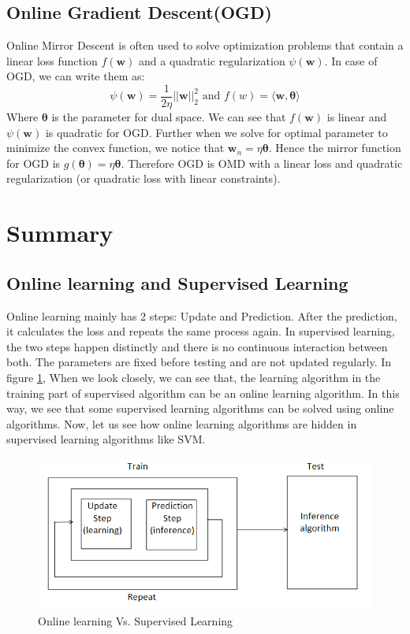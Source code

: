 \documentclass[11pt]{article}
\begin{document}
\subsection{Online Gradient Descent(OGD)}
Online Mirror Descent is often used to solve optimization problems that contain a linear loss function $f(\mathbf{w})$ and a quadratic regularization $\psi(\mathbf{w})$. In case of OGD, we can write them as:
\[\psi(\mathbf{w}) = \frac{1}{2\eta}||\mathbf{w}||_{2}^{2} \text{  and } f(w) = \langle \mathbf{w},\mathbf{\theta} \rangle\]
Where $\mathbf\theta$ is the parameter for dual space. We can see that $f(\mathbf{w})$ is linear and $\psi(\mathbf{w})$ is quadratic for OGD. Further when we solve for optimal parameter to minimize the convex function, we notice that $\mathbf{w}_{n} = \eta\mathbf{\theta}$.
Hence the mirror function for OGD is $g(\mathbf{\theta}) = \eta\mathbf{\theta}$. Therefore OGD is OMD with a linear loss and quadratic regularization (or quadratic loss with linear constraints).
\section{Summary}
\subsection{Online learning and Supervised Learning}
\normalfont
Online learning mainly has 2 steps: Update and Prediction. After the prediction, it calculates the loss and repeats the same process again. In supervised learning, the two steps happen distinctly and there is no continuous interaction between both. The parameters are fixed before testing and are not updated regularly. In figure \ref{fig:online}, When we look closely, we can see that, the learning algorithm in the training part of supervised algorithm can be an online learning algorithm. In this way, we see that some supervised learning algorithms can be solved using online algorithms. Now, let us see how online learning algorithms are hidden in supervised learning algorithms like SVM.
\begin{figure}[h!]
    \centering
  \includegraphics[scale=0.7]{fig1.PNG}
  \caption{Online learning Vs. Supervised Learning}
  \label{fig:online}
\end{figure}
\end{document}
